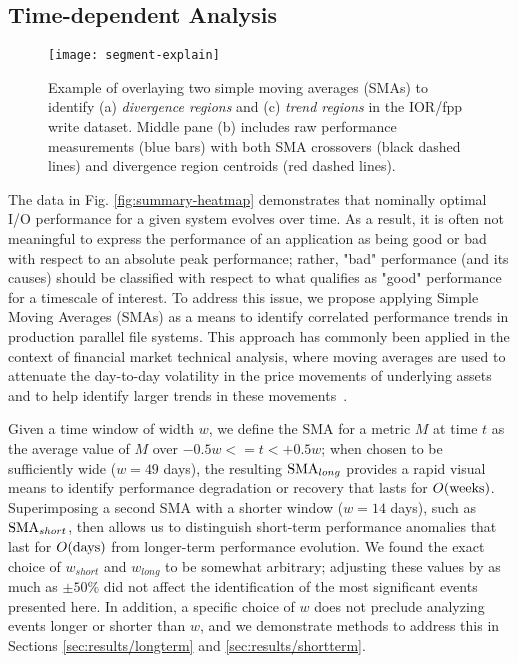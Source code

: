 




\subsection{Time-dependent Analysis} \label{sec:features/timedependent}

\begin{figure}[t]
    \centering
    \texttt{[image: segment-explain]}
    \vspace{-.35in}
    \caption{Example of overlaying two simple moving averages (SMAs) to identify (a) \emph{divergence regions} and (c) \emph{trend regions} in the \edison \scratchtwo IOR/fpp write dataset.  Middle pane (b) includes raw performance measurements (blue bars) with both SMA crossovers (black dashed lines) and divergence region centroids (red dashed lines).}
    \label{fig:segment-explain}
\end{figure}

The data in Fig. \ref{fig:summary-heatmap} demonstrates that nominally optimal I/O performance for a given system evolves over time.
As a result, it is often not meaningful to express the performance of an application as being good or bad with respect to an absolute peak performance;
rather, "bad" performance (and its causes) should be classified with respect to what qualifies as "good" performance for a timescale of interest.
To address this issue, we propose applying Simple Moving Averages (SMAs) as a means to identify correlated performance trends in production parallel file systems.
This approach has commonly been applied in the context of financial market technical analysis, where moving averages are used to attenuate the day-to-day volatility in the price movements of underlying assets and to help identify larger trends in these movements~\cite{james1968monthly,gunasekarage2001profitability}.

Given a time window of width $w$, we define the SMA for a metric $M$ at time $t$ as the average value of $M$ over ${-0.5w <= t < +0.5w}$;
when chosen to be sufficiently wide ($w = 49$ days), the resulting $\textup{SMA}_{long}$ provides a rapid visual means to identify performance degradation or recovery that lasts for $O(\textup{weeks})$.
Superimposing a second SMA with a shorter window ($w = 14$ days), such as $\textup{SMA}_{short}$, then allows us to distinguish short-term performance anomalies that last for $O(\textup{days})$ from longer-term performance evolution.
We found the exact choice of $w_{short}$ and $w_{long}$ to be somewhat arbitrary; adjusting these values by as much as $\pm 50\%$ did not affect the identification of the most significant events presented here.
In addition, a specific choice of $w$ does not preclude analyzing events longer or shorter than $w$, and we demonstrate methods to address this in Sections \ref{sec:results/longterm} and \ref{sec:results/shortterm}.

